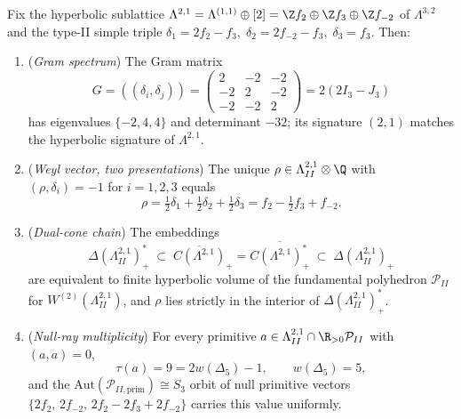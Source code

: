 \begin{lemma}
\label{lem:hochcalc-hdelta5-weyl-vector-null-ray}
Fix the hyperbolic sublattice
$\Lambda^{2,1} = \Lambda^{(1,1)}\oplus [2]
= \Z f_2\oplus \Z f_3\oplus \Z f_{-2}$
of $\Lambda^{3,2}$ and the type-II simple triple
$\delta_1 = 2 f_2 - f_3,\;\delta_2 = 2 f_{-2} - f_3,\;\delta_3 = f_3$.
Then:
\begin{enumerate}[label=(\roman*),leftmargin=1.5em]
\item (\emph{Gram spectrum}) The Gram matrix
\[
G = ((\delta_i, \delta_j)) = \begin{pmatrix} 2 & -2 & -2 \\ -2 & 2 & -2 \\ -2 & -2 & 2 \end{pmatrix}
= 2(2 I_3 - J_3)
\]
has eigenvalues $\{-2, 4, 4\}$ and determinant $-32$; its signature
$(2,1)$ matches the hyperbolic signature of $\Lambda^{2,1}$.
\item (\emph{Weyl vector, two presentations}) The unique
$\rho \in \Lambda^{2,1}_{II} \otimes \Q$ with $(\rho, \delta_i) = -1$
for $i = 1,2,3$ equals
\[
\rho = \tfrac{1}{2}\delta_1 + \tfrac{1}{2}\delta_2 + \tfrac{1}{2}\delta_3
 = f_2 - \tfrac{1}{2} f_3 + f_{-2}.
\]
\item (\emph{Dual-cone chain}) The embeddings
\[
\Delta(\Lambda^{2,1}_{II})^*_+ \;\subset\; \overline{C(\Lambda^{2,1})}_+
= \overline{C(\Lambda^{2,1})^*_+} \;\subset\; \Delta(\Lambda^{2,1}_{II})_+
\]
are equivalent to finite hyperbolic volume of the fundamental polyhedron
$\mathcal P_{II}$ for $W^{(2)}(\Lambda^{2,1}_{II})$, and $\rho$ lies
strictly in the interior of $\Delta(\Lambda^{2,1}_{II})^*_+$.
\item (\emph{Null-ray multiplicity})
For every primitive $a \in \Lambda^{2,1}_{II} \cap \R_{>0} \mathcal P_{II}$
with $(a, a) = 0$,
\[
\tau(a) = 9 = 2 w(\Delta_5) - 1,
\qquad w(\Delta_5) = 5,
\]
and the $\mathrm{Aut}(\mathcal P_{II,\mathrm{prim}}) \cong S_3$ orbit
of null primitive vectors $\{2 f_2,\, 2 f_{-2},\, 2 f_2 - 2 f_3 + 2 f_{-2}\}$
carries this value uniformly.
\end{enumerate}
\end{lemma}
